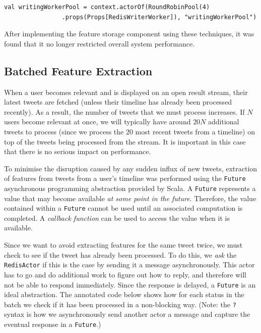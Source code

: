 \documentclass{l4proj}
\newcommand{\code}[1]{\texttt{#1}}
\begin{document}
        \begin{lstlisting}[caption=Creating an actor pool to reduce the work required by any single actor.]
          val writingWorkerPool = context.actorOf(RoundRobinPool(4)
                .props(Props[RedisWriterWorker]), "writingWorkerPool")
        \end{lstlisting}

        
        After implementing the feature storage component using these techniques, it was found that it no longer restricted overall system performance.
        
        \subsection{Batched Feature Extraction}
        When a user becomes relevant and is displayed on an open result stream, their latest tweets are fetched (unless their timeline has already been processed recently). As a result, the number of tweets that we must process increases. If $N$ users become relevant at once, we will typically have around $20N$ additional tweets to process  (since we process the 20 most recent tweets from a timeline) on top of the tweets being processed from the stream. It is important in this case that there is no serious impact on performance.
        
        To minimise the disruption caused by any sudden influx of new tweets, extraction of features from tweets from a user's timeline was performed using the \code{Future} asynchronous programming abstraction provided by Scala. A \code{Future} represents a value that may become available \textit{at some point in the future}. Therefore, the value contained within a \code{Future} cannot be used until an associated computation is completed. A \textit{callback function} can be used to access the value when it is available.
        
        Since we want to avoid extracting features for the same tweet twice, we must check to see if the tweet has already been processed. To do this, we \textit{ask} the \code{RedisActor} if this is the case by sending it a message asynchronously. This actor has to go and do additional work to figure out how to reply, and therefore will not be able to respond immediately. Since the response is delayed, a \code{Future} is an ideal abstraction. The annotated code below shows how for each status in the batch we check if it has been processed in a non-blocking way. (Note: the \code{?} syntax is how we asynchronously send another actor a message and capture the eventual response in a \code{Future}.)
        
\end{document}
